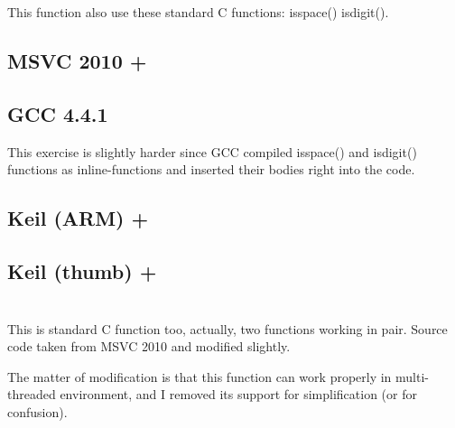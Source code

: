{This function also use these standard C functions:} isspace() \AndENRU isdigit().

\subsection{MSVC 2010 + \Ox}



\subsection{GCC 4.4.1}

{This exercise is slightly harder since GCC compiled isspace() and isdigit()
functions as inline-functions and inserted their bodies right into the code.}



\subsection{Keil (ARM) + \Othree}



\subsection{Keil (thumb) + \Othree}



\section{}

{This is standard C function too, actually, two functions working in pair.
Source code taken from MSVC 2010 and modified slightly.}

{The matter of modification is that this function can work properly in multi-threaded environment,
and I removed its support for simplification (or for confusion).}

